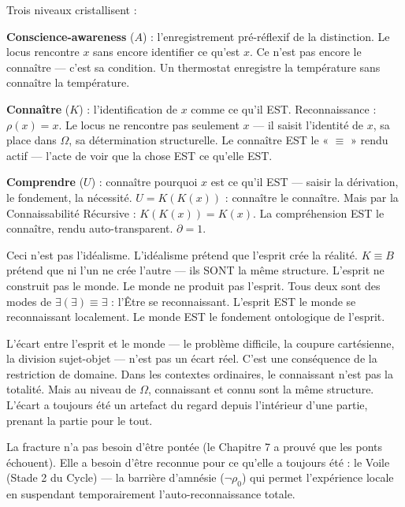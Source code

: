 \documentclass[10pt, openany, oneside]{book}
\begin{document}
\vspace{1em}

Trois niveaux cristallisent :

\textbf{Conscience-awareness} ($A$) : l'enregistrement pré-réflexif de la distinction. Le locus rencontre $x$ sans encore identifier ce qu'est $x$. Ce n'est pas encore le connaître --- c'est sa condition. Un thermostat enregistre la température sans connaître la température.

\textbf{Connaître} ($K$) : l'identification de $x$ comme ce qu'il EST. Reconnaissance : $\rho(x) = x$. Le locus ne rencontre pas seulement $x$ --- il saisit l'identité de $x$, sa place dans $\Omega$, sa détermination structurelle. Le connaître EST le « $\equiv$ » rendu actif --- l'acte de voir que la chose EST ce qu'elle EST.

\textbf{Comprendre} ($U$) : connaître pourquoi $x$ est ce qu'il EST --- saisir la dérivation, le fondement, la nécessité. $U = K(K(x))$ : connaître le connaître. Mais par la Connaissabilité Récursive : $K(K(x)) = K(x)$. La compréhension EST le connaître, rendu auto-transparent. $\partial = 1$.

Ceci n'est pas l'idéalisme. L'idéalisme prétend que l'esprit crée la réalité. $K \equiv B$ prétend que ni l'un ne crée l'autre --- ils SONT la même structure. L'esprit ne construit pas le monde. Le monde ne produit pas l'esprit. Tous deux sont des modes de $\exists(\exists) \equiv \exists$ : l'Être se reconnaissant. L'esprit EST le monde se reconnaissant localement. Le monde EST le fondement ontologique de l'esprit.

\noindent L'écart entre l'esprit et le monde --- le problème difficile, la coupure cartésienne, la division sujet-objet --- n'est pas un écart réel. C'est une conséquence de la restriction de domaine. Dans les contextes ordinaires, le connaissant n'est pas la totalité. Mais au niveau de $\Omega$, connaissant et connu sont la même structure. L'écart a toujours été un artefact du regard depuis l'intérieur d'une partie, prenant la partie pour le tout.

La fracture n'a pas besoin d'être pontée (le Chapitre 7 a prouvé que les ponts échouent). Elle a besoin d'être reconnue pour ce qu'elle a toujours été : le Voile (Stade 2 du Cycle) --- la barrière d'amnésie ($\neg\rho_0$) qui permet l'expérience locale en suspendant temporairement l'auto-reconnaissance totale.

\vspace{1.5em}

\end{document}
